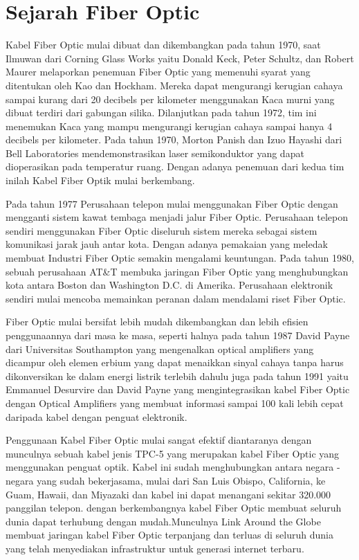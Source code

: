 \section{Sejarah Fiber Optic}
\begin{flushleft}
Kabel Fiber Optic mulai dibuat dan dikembangkan pada tahun 1970, saat Ilmuwan dari Corning Glass Works yaitu Donald Keck, Peter Schultz, dan Robert Maurer melaporkan penemuan Fiber Optic yang memenuhi syarat yang ditentukan oleh Kao dan Hockham. Mereka dapat mengurangi kerugian cahaya sampai kurang dari 20 decibels per kilometer menggunakan Kaca murni yang dibuat terdiri dari gabungan silika. Dilanjutkan pada tahun 1972, tim ini menemukan Kaca yang mampu mengurangi kerugian cahaya sampai hanya 4 decibels per kilometer. Pada tahun 1970, Morton Panish dan Izuo Hayashi dari Bell Laboratories mendemonstrasikan laser semikonduktor yang dapat dioperasikan pada temperatur ruang. Dengan adanya penemuan dari kedua tim inilah Kabel Fiber Optik mulai berkembang.
\end{flushleft}
\begin{flushleft}
Pada tahun 1977 Perusahaan telepon mulai menggunakan Fiber Optic dengan mengganti sistem kawat tembaga menjadi jalur Fiber Optic. Perusahaan telepon sendiri menggunakan Fiber Optic diseluruh sistem mereka sebagai sistem komunikasi jarak jauh antar kota. Dengan adanya pemakaian yang meledak membuat Industri Fiber Optic semakin mengalami keuntungan. Pada tahun 1980, sebuah perusahaan AT\&T membuka jaringan Fiber Optic yang menghubungkan kota antara Boston dan Washington D.C. di Amerika. Perusahaan elektronik sendiri mulai mencoba memainkan peranan dalam mendalami riset Fiber Optic.
\end{flushleft}
\begin{flushleft}
Fiber Optic mulai bersifat lebih mudah dikembangkan dan lebih efisien penggunaannya dari masa ke masa, seperti halnya pada tahun 1987 David Payne dari Universitas Southampton yang mengenalkan optical amplifiers yang dicampur oleh elemen erbium yang dapat menaikkan sinyal cahaya tanpa harus dikonversikan ke dalam energi listrik terlebih dahulu juga pada tahun 1991 yaitu Emmanuel Desurvire dan David Payne yang mengintegrasikan kabel Fiber Optic dengan Optical Amplifiers yang membuat informasi sampai 100 kali lebih cepat daripada kabel dengan penguat elektronik.
\end{flushleft}
\begin{flushleft}
Penggunaan Kabel Fiber Optic mulai sangat efektif diantaranya dengan munculnya sebuah kabel jenis TPC-5 yang merupakan kabel Fiber Optic yang menggunakan penguat optik. Kabel ini sudah menghubungkan antara negara - negara yang sudah bekerjasama, mulai dari San Luis Obispo, California, ke Guam, Hawaii, dan Miyazaki dan kabel ini dapat menangani sekitar 320.000 panggilan telepon. dengan berkembangnya kabel Fiber Optic membuat seluruh dunia dapat terhubung dengan mudah.Munculnya Link Around the Globe membuat jaringan kabel Fiber Optic terpanjang dan terluas di seluruh dunia yang telah menyediakan infrastruktur untuk generasi internet terbaru.
\end{flushleft}
